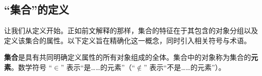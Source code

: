 \subsection{``集合''的定义}

让我们从定义开始。正如前文解释的那样，集合的特征在于其包含的对象分组以及定义该集合的属性。以下定义旨在精确化这一概念，同时引入相关符号与术语。

\begin{definition}
     \textbf{集合}是具有共同明确定义属性的所有对象组成的全体。集合中的对象称为集合的\textbf{元素}。数学符号 ``$\in$'' 表示``是……的元素''（``$\notin$'' 表示``不是……的元素''）。
\end{definition}
